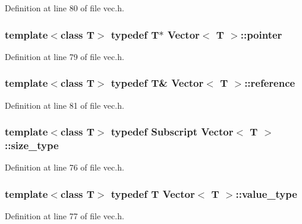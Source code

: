 Definition at line 80 of file vec.\+h.

\hypertarget{class_vector_a79c196184d53dc1e6c4f7841392e528e}{
\subsubsection[{pointer}]{\setlength{\rightskip}{0pt plus 5cm}template$<$class T$>$ typedef T$\ast$ {\bf Vector}$<$ T $>$\+::{\bf pointer}}}\label{class_vector_a79c196184d53dc1e6c4f7841392e528e}


Definition at line 79 of file vec.\+h.

\hypertarget{class_vector_aacab8f5d93fda39cbdf810e3440d1c29}{
\subsubsection[{reference}]{\setlength{\rightskip}{0pt plus 5cm}template$<$class T$>$ typedef T\& {\bf Vector}$<$ T $>$\+::{\bf reference}}}\label{class_vector_aacab8f5d93fda39cbdf810e3440d1c29}


Definition at line 81 of file vec.\+h.

\hypertarget{class_vector_af11e5408e13f84b5de506db7681cf46e}{
\subsubsection[{size\+\_\+type}]{\setlength{\rightskip}{0pt plus 5cm}template$<$class T$>$ typedef {\bf Subscript} {\bf Vector}$<$ T $>$\+::{\bf size\+\_\+type}}}\label{class_vector_af11e5408e13f84b5de506db7681cf46e}


Definition at line 76 of file vec.\+h.

\hypertarget{class_vector_a79be47483938eb902a0a5af772985850}{
\subsubsection[{value\+\_\+type}]{\setlength{\rightskip}{0pt plus 5cm}template$<$class T$>$ typedef T {\bf Vector}$<$ T $>$\+::{\bf value\+\_\+type}}}\label{class_vector_a79be47483938eb902a0a5af772985850}


Definition at line 77 of file vec.\+h.



